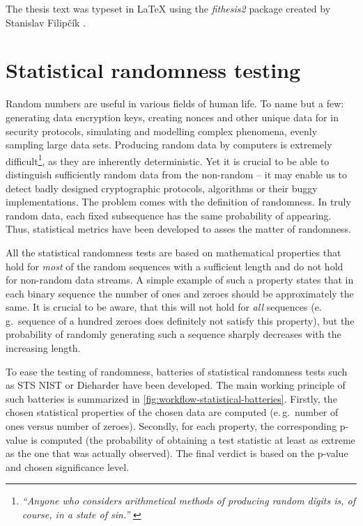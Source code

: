 \documentclass[12pt,oneside]{fithesis2}		%
\renewcommand{\_}{\leavevmode \kern0.0em\vbox{\hrule width0.4em}}
\begin{document}
The thesis text was typeset in \LaTeX{} using the \textit{fithesis2} package created by Stanislav Filipčík \parencite{fithesis}.

\chapter{Statistical randomness testing}
\label{chap:stat-rand-testing}

Random numbers are useful in various fields of human life. 
To name but a few: generating data encryption keys, creating nonces and other unique data for in security protocols,
simulating and modelling complex phenomena, evenly sampling large data sets.
Producing random data by computers is extremely difficult\footnote{\textit{``Anyone who considers arithmetical methods of producing 
random digits is, of course, in a state of sin.''} \parencite{neumann-random}}, as they are inherently deterministic.
Yet it is crucial to be able to distinguish sufficiently random data from the non-random -- it may enable us
to detect badly designed cryptographic protocols, algorithms or their buggy implementations.
The problem comes with the definition of randomness. In truly random data, each fixed subsequence 
has the same probability of appearing. Thus, statistical metrics have been developed to asses the matter of randomness.

All the statistical randomness tests are based on mathematical properties that hold for
\textit{most} of the random sequences with a sufficient length and do not hold for non-random data streams.
A simple example of such a property states that in each binary sequence the number of ones and zeroes should be 
approximately the same. It is crucial to be aware, that this will not hold for \textit{all} sequences (e.\,g.\ sequence of 
a hundred zeroes does definitely not satisfy this property),
but the probability of randomly generating such a sequence sharply decreases with the increasing length.

To ease the testing of randomness, batteries of statistical randomness tests such as STS NIST or Dieharder have been developed. 
The main working principle of such batteries is summarized in \autoref{fig:workflow-statistical-batteries}. 
Firstly, the chosen statistical properties of the chosen data are computed (e.\,g.\ number of ones versus number of zeroes). 
Secondly, for each property, the corresponding p-value is computed
(the probability of obtaining a test statistic at least as extreme as the one that was actually observed).
The final verdict is based on the p-value and chosen significance level.
\end{document}

